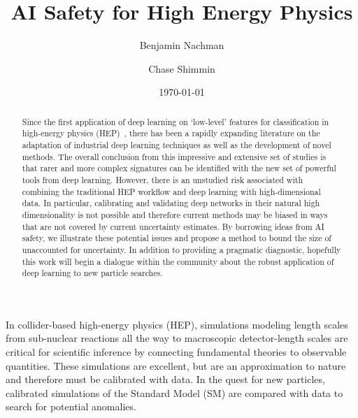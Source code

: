 \documentclass[reprint,nofootinbib,...]{revtex4-1}
\begin{document}
\title{AI Safety for High Energy Physics}

\author{Benjamin Nachman}


\author{Chase Shimmin}


\begin{abstract}
Since the first application of deep learning on `low-level' features for classification in high-energy physics (HEP)~\cite{Baldi:2014kfa}, there has been a rapidly expanding literature on the adaptation of industrial deep learning techniques as well as the development of novel methods.  The overall conclusion from this impressive and extensive set of studies is that rarer and more complex signatures can be identified with the new set of powerful tools from deep learning.  However, there is an unstudied risk associated with combining the traditional HEP workflow and deep learning with high-dimensional data.  In particular, calibrating and validating deep networks in their natural high dimensionality is not possible and therefore current methods may be biased in ways that are not covered by current uncertainty estimates.  By borrowing ideas from AI safety, we illustrate these potential issues and propose a method to bound the size of unaccounted for uncertainty.  In addition to providing a pragmatic diagnostic, hopefully this work will begin a dialogue within the community about the robust application of deep learning to new particle searches.
\end{abstract}

\date{\today}
\maketitle


In collider-based high-energy physics (HEP), simulations modeling length scales from sub-nuclear reactions all the way to macroscopic detector-length scales are critical for scientific inference by connecting fundamental theories to observable quantities.  These simulations are excellent, but are an approximation to nature and therefore must be calibrated with data. In the quest for new particles, calibrated simulations of the Standard Model (SM) are compared with data to search for potential anomalies.
\end{document}
